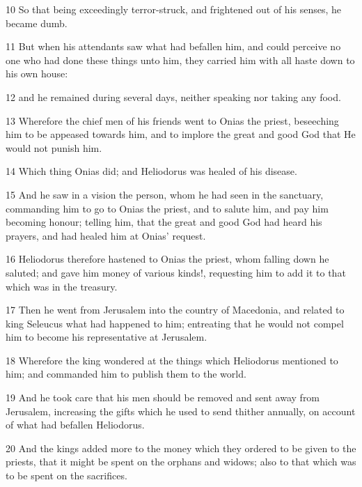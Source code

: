 \par 10 So that being exceedingly terror-struck, and frightened out of his senses, he became dumb. 

\par 11 But when his attendants saw what had befallen him, and could perceive no one who had done these things unto him, they carried him with all haste down to his own house: 

\par 12 and he remained during several days, neither speaking nor taking any food. 

\par 13 Wherefore the chief men of his friends went to Onias the priest, beseeching him to be appeased towards him, and to implore the great and good God that He would not punish him. 

\par 14 Which thing Onias did; and Heliodorus was healed of his disease. 

\par 15 And he saw in a vision the person, whom he had seen in the sanctuary, commanding him to go to Onias the priest, and to salute him, and pay him becoming honour; telling him, that the great and good God had heard his prayers, and had healed him at Onias’ request. 

\par 16 Heliodorus therefore hastened to Onias the priest, whom falling down he saluted; and gave him money of various kinds!, requesting him to add it to that which was in the treasury. 

\par 17 Then he went from Jerusalem into the country of Macedonia, and related to king Seleucus what had happened to him; entreating that he would not compel him to become his representative at Jerusalem. 

\par 18 Wherefore the king wondered at the things which Heliodorus mentioned to him; and commanded him to publish them to the world. 

\par 19 And he took care that his men should be removed and sent away from Jerusalem, increasing the gifts which he used to send thither annually, on account of what had befallen Heliodorus. 

\par 20 And the kings added more to the money which they ordered to be given to the priests, that it might be spent on the orphans and widows; also to that which was to be spent on the sacrifices. 

